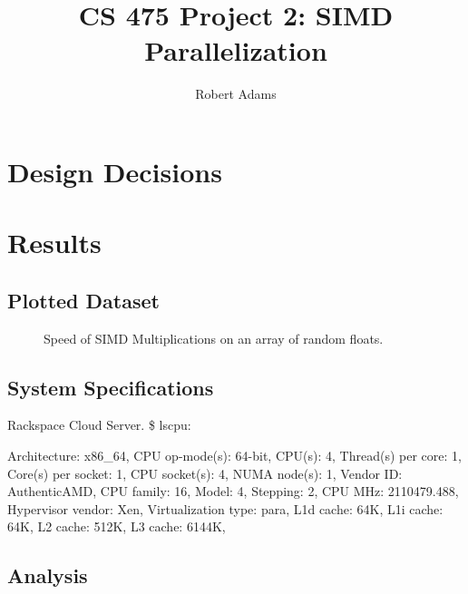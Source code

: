 \documentclass[letterpaper,10pt]{article} %
\begin{document}
\title{CS 475 Project 2: SIMD Parallelization } 
  \author{Robert Adams}
\maketitle


\section{Design Decisions}


\section{Results}

\subsection{Plotted Dataset}

\begin{figure} [ht]
    \centering
    
    \caption{Speed of SIMD Multiplications on an array of random floats. }
    \label{runtimes}
\end{figure}

\subsection{System Specifications}

Rackspace Cloud Server. \$ lscpu:

Architecture:          x86\_64,
CPU op-mode(s):        64-bit,
CPU(s):                4,
Thread(s) per core:    1,
Core(s) per socket:    1,
CPU socket(s):         4,
NUMA node(s):          1,
Vendor ID:             AuthenticAMD,
CPU family:            16,
Model:                 4,
Stepping:              2,
CPU MHz:               2110479.488,
Hypervisor vendor:     Xen,
Virtualization type:   para,
L1d cache:             64K,
L1i cache:             64K,
L2 cache:              512K,
L3 cache:              6144K,

\subsection{Analysis}
\end{document}
